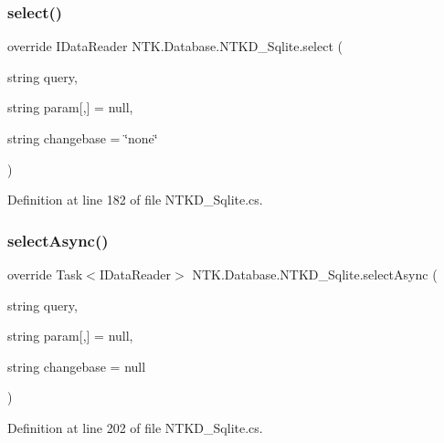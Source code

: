\mbox{\label{class_n_t_k_1_1_database_1_1_n_t_k_d___sqlite_ad1298d0c33e36fc7ea48f511aebb21eb}} 
\subsubsection{\texorpdfstring{select()}{select()}}
{\footnotesize\ttfamily override I\+Data\+Reader N\+T\+K.\+Database.\+N\+T\+K\+D\+\_\+\+Sqlite.\+select (\begin{DoxyParamCaption}\item[{string}]{query,  }\item[{string}]{param\mbox{[},\mbox{]} = {\ttfamily null},  }\item[{string}]{changebase = {\ttfamily \char`\"{}none\char`\"{}} }\end{DoxyParamCaption})}



Definition at line 182 of file N\+T\+K\+D\+\_\+\+Sqlite.\+cs.

\mbox{\label{class_n_t_k_1_1_database_1_1_n_t_k_d___sqlite_a4af37b34c896824b4c1a60c8b8dc01f7}} 
\subsubsection{\texorpdfstring{selectAsync()}{selectAsync()}}
{\footnotesize\ttfamily override Task$<$I\+Data\+Reader$>$ N\+T\+K.\+Database.\+N\+T\+K\+D\+\_\+\+Sqlite.\+select\+Async (\begin{DoxyParamCaption}\item[{string}]{query,  }\item[{string}]{param\mbox{[},\mbox{]} = {\ttfamily null},  }\item[{string}]{changebase = {\ttfamily null} }\end{DoxyParamCaption})}



Definition at line 202 of file N\+T\+K\+D\+\_\+\+Sqlite.\+cs.

\mbox{\label{class_n_t_k_1_1_database_1_1_n_t_k_d___sqlite_a4e9dc4e5e2b8a496faf48d63a47571e3}} 
